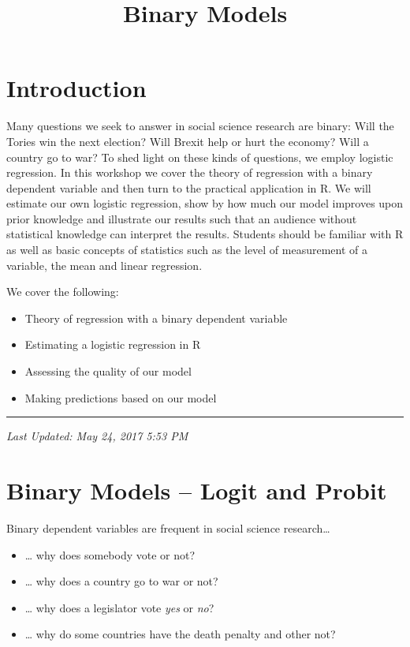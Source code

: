 \documentclass[]{article}
\title{Binary Models}
\author{}
\date{}
\providecommand{\tightlist}{%
  \setlength{\itemsep}{0pt}\setlength{\parskip}{0pt}}
\theoremstyle{definition}
\theoremstyle{definition}
\theoremstyle{remark}
\begin{document}
\maketitle

{
\setcounter{tocdepth}{2}
\tableofcontents
}
\section{Introduction}\label{introduction}

Many questions we seek to answer in social science research are binary:
Will the Tories win the next election? Will Brexit help or hurt the
economy? Will a country go to war? To shed light on these kinds of
questions, we employ logistic regression. In this workshop we cover the
theory of regression with a binary dependent variable and then turn to
the practical application in R. We will estimate our own logistic
regression, show by how much our model improves upon prior knowledge and
illustrate our results such that an audience without statistical
knowledge can interpret the results. Students should be familiar with R
as well as basic concepts of statistics such as the level of measurement
of a variable, the mean and linear regression.

We cover the following:

\begin{itemize}
\tightlist
\item
  Theory of regression with a binary dependent variable
\item
  Estimating a logistic regression in R
\item
  Assessing the quality of our model
\item
  Making predictions based on our model
\end{itemize}

\begin{center}\rule{0.5\linewidth}{\linethickness}\end{center}

\emph{Last Updated: May 24, 2017 5:53 PM}

\section{Binary Models -- Logit and
Probit}\label{binary-models-logit-and-probit}

Binary dependent variables are frequent in social science
research\ldots{}

\begin{itemize}
\tightlist
\item
  \ldots{} why does somebody vote or not?
\item
  \ldots{} why does a country go to war or not?
\item
  \ldots{} why does a legislator vote \emph{yes} or \emph{no}?
\item
  \ldots{} why do some countries have the death penalty and other not?
\end{itemize}
\end{document}
